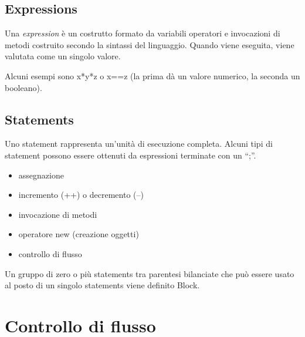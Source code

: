 \documentclass[a4paper,12pt,twoside]{book}
\begin{document}
\subsection{Expressions}

Una \emph{expression} è un costrutto formato da variabili operatori e
invocazioni di metodi costruito secondo la sintassi del
linguaggio. Quando viene eseguita, viene valutata come un singolo
valore.

Alcuni esempi sono x*y*z o x==z (la prima dà un valore numerico, la
seconda un booleano).

\subsection{Statements}

Uno statement rappresenta un’unità di esecuzione completa. Alcuni tipi
di statement possono essere ottenuti da espressioni terminate con un
“;”.
\begin{itemize}
\item assegnazione
\item incremento (++) o decremento (--)
\item invocazione di metodi
\item operatore new (creazione oggetti)
\item controllo di flusso
\end{itemize}

Un gruppo di zero o più statements tra parentesi bilanciate che può
essere usato al posto di un singolo statements viene definito Block.

\section{Controllo di flusso}
\end{document}
